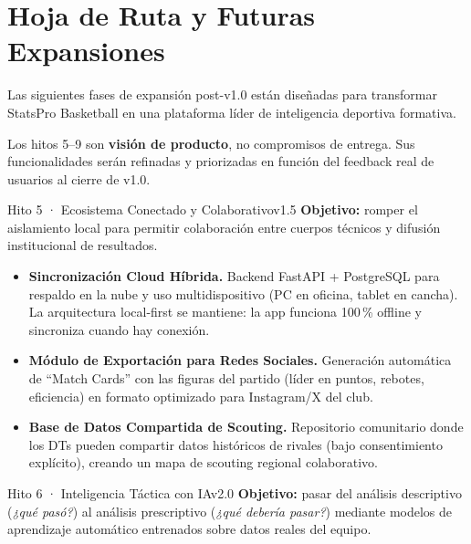 \documentclass[11pt,a4paper]{article}
\begin{document}
\section{Hoja de Ruta y Futuras Expansiones}

Las siguientes fases de expansión post-v1.0 están diseñadas para transformar StatsPro Basketball en una plataforma líder de inteligencia deportiva formativa.

\begin{notebox}
Los hitos 5–9 son \textbf{visión de producto}, no compromisos de entrega. Sus funcionalidades serán refinadas y priorizadas en función del feedback real de usuarios al cierre de v1.0.
\end{notebox}

\begin{roadbox}{Hito 5 · Ecosistema Conectado y Colaborativo}{v1.5}
\small\textcolor{accentlight}{%
  \textbf{Objetivo:} romper el aislamiento local para permitir colaboración entre cuerpos técnicos y difusión institucional de resultados.
}
\end{roadbox}

\begin{itemize}
  \item \textbf{Sincronización Cloud Híbrida.} Backend FastAPI + PostgreSQL para respaldo en la nube y uso multidispositivo (PC en oficina, tablet en cancha). La arquitectura local-first se mantiene: la app funciona 100\,\% offline y sincroniza cuando hay conexión.
  \item \textbf{Módulo de Exportación para Redes Sociales.} Generación automática de ``Match Cards'' con las figuras del partido (líder en puntos, rebotes, eficiencia) en formato optimizado para Instagram/X del club.
  \item \textbf{Base de Datos Compartida de Scouting.} Repositorio comunitario donde los DTs pueden compartir datos históricos de rivales (bajo consentimiento explícito), creando un mapa de scouting regional colaborativo.
\end{itemize}

\begin{roadbox}{Hito 6 · Inteligencia Táctica con IA}{v2.0}
\small\textcolor{accentlight}{%
  \textbf{Objetivo:} pasar del análisis descriptivo (\textit{¿qué pasó?}) al análisis prescriptivo (\textit{¿qué debería pasar?}) mediante modelos de aprendizaje automático entrenados sobre datos reales del equipo.
}
\end{roadbox}
\end{document}
